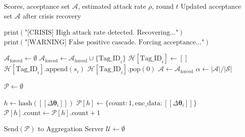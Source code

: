 \documentclass[10pt,journal,compsoc]{IEEEtran}
\begin{document}
\begin{algorithm}[H]
\caption{FIP-FL Per-Round Verification Protocol (Part 3: Crisis Recovery)}
\label{alg:round3}
\begin{algorithmic}[1]
\Require Scores, acceptance set $\mathcal{A}$, estimated attack rate $\rho$, round $t$
\Ensure Updated acceptance set $\mathcal{A}$ after crisis recovery

        \State $\text{print}(\text{"[CRISIS] High attack rate detected. Recovering..."})$
    \Else
        \State $\text{print}(\text{"[WARNING] False positive cascade. Forcing acceptance..."})$
    \EndIf
    
    \State $\mathcal{A}_{\text{forced}} \gets \emptyset$
            \State $\mathcal{A}_{\text{forced}} \gets \mathcal{A}_{\text{forced}} \cup \{\text{Tag\_ID}_i\}$
             $\mathcal{H}[\text{Tag\_ID}_i] \gets []$ \EndIf
            \State $\mathcal{H}[\text{Tag\_ID}_i].\text{append}(s_i)$
             $\mathcal{H}[\text{Tag\_ID}_i].\text{pop}(0)$ \EndIf
        \EndIf
    \EndFor
    \State $\mathcal{A} \gets \mathcal{A}_{\text{forced}}$
    \State $\alpha \gets |\mathcal{A}| / |\mathcal{S}|$
\EndIf

\State $\mathcal{P} \gets \emptyset$ 

    \State $h \gets \text{hash}([\![\Delta \bm{\theta}_i]\!])$
        \State $\mathcal{P}[h] \gets \{\text{count}: 1, \text{enc\_data}: [\![\Delta \bm{\theta}_i]\!]\}$
    \Else
        \State $\mathcal{P}[h].\text{count} \gets \mathcal{P}[h].\text{count} + 1$
    \EndIf
\EndFor

\State $\text{Send}(\mathcal{P})$ to Aggregation Server
\State $\mathcal{U} \gets \emptyset$
\end{algorithmic}
\end{algorithm}
\end{document}
